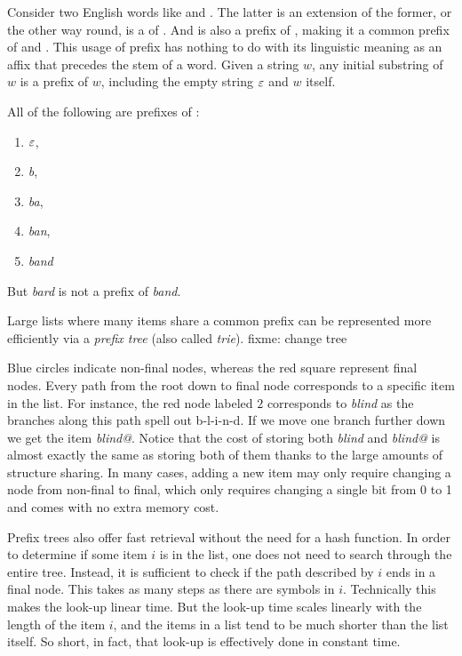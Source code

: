 \begin{programming}
Consider two English words like  and .
The latter is an extension of the former, or the other way round,  is a  of .
And  is also a prefix of , making it a common prefix of  and .
This usage of prefix has nothing to do with its linguistic meaning as an affix that precedes the stem of a word.
Given a string $w$, any initial substring of $w$ is a prefix of $w$, including the empty string $\varepsilon$ and $w$ itself.
%
\begin{examplebox}
    All of the following are prefixes of :
    \begin{enumerate}
        \item $\varepsilon$,
        \item \emph{b},
        \item \emph{ba},
        \item \emph{ban},
        \item \emph{band}
    \end{enumerate}
    But \emph{bard} is not a prefix of \emph{band}.
\end{examplebox}
%
Large lists where many items share a common prefix can be represented more efficiently via a \emph{prefix tree} (also called \emph{trie}).
fixme: change tree
%
\begin{center}
    
\end{center}
%
Blue circles indicate non-final nodes, whereas the red square represent final nodes.
Every path from the root down to final node corresponds to a specific item in the list.
For instance, the red node labeled $2$ corresponds to \emph{blind} as the branches along this path spell out b-l-i-n-d.
If we move one branch further down we get the item \emph{blind@}.
Notice that the cost of storing both \emph{blind} and \emph{blind@} is almost exactly the same as storing both of them thanks to the large amounts of structure sharing.
In many cases, adding a new item may only require changing a node from non-final to final, which only requires changing a single bit from 0 to 1 and comes with no extra memory cost.

Prefix trees also offer fast retrieval without the need for a hash function.
In order to determine if some item $i$ is in the list, one does not need to search through the entire tree.
Instead, it is sufficient to check if the path described by $i$ ends in a final node.
This takes as many steps as there are symbols in $i$.
Technically this makes the look-up linear time.
But the look-up time scales linearly with the length of the item $i$, and the items in a list tend to be much shorter than the list itself.
So short, in fact, that look-up is effectively done in constant time.


\end{programming}

